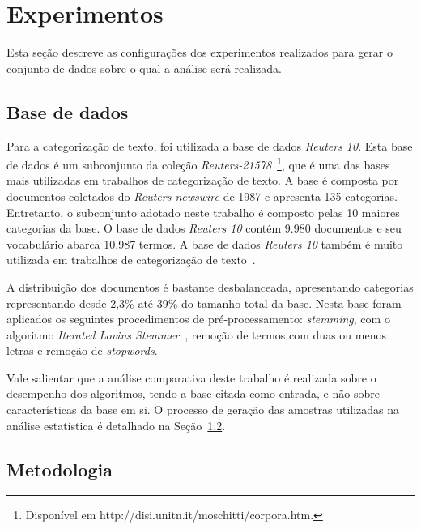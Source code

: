 \documentclass[conference]{IEEEtran}
\begin{document}

\section{Experimentos}
\label{sec:exp}

Esta seção descreve as configurações dos experimentos realizados para gerar o conjunto de dados sobre o qual a análise será realizada.

\subsection{Base de dados}
\label{sec:bd}

Para a categorização de texto, foi utilizada a base de dados \textit{Reuters 10}.
Esta base de dados é um subconjunto da coleção \textit{Reuters-21578}~\footnote{Disponível em http://disi.unitn.it/moschitti/corpora.htm.}, que é uma das bases mais utilizadas em trabalhos de categorização de texto.
A base é composta por documentos coletados do \textit{Reuters newswire} de 1987 e apresenta 135 categorias.
Entretanto, o subconjunto adotado neste trabalho é composto pelas 10 maiores categorias da base.
O base de dados \textit{Reuters 10} contém 9.980 documentos e seu vocabulário abarca 10.987 termos.
A base de dados \textit{Reuters 10} também é muito utilizada em trabalhos de categorização de texto~\cite{chang2008multilabel,chen2009feature,yang2011new}. 

A distribuição dos documentos é bastante desbalanceada, apresentando categorias representando desde 2,3\% até 39\% do tamanho total da base. 
Nesta base foram aplicados os seguintes procedimentos de pré-processamento: \textit{stemming}, com o algoritmo \textit{Iterated Lovins Stemmer}~\cite{lovins1968development}, 
remoção de termos com duas ou menos letras e remoção de \textit{stopwords}.

Vale salientar que  a análise comparativa deste trabalho é realizada sobre o desempenho dos algoritmos, tendo a base citada como entrada, e não sobre características da base em si. O processo de geração das amostras utilizadas na análise estatística é detalhado na Seção~\ref{sec:metodologia}.

\subsection{Metodologia}
\label{sec:metodologia}
\end{document}
